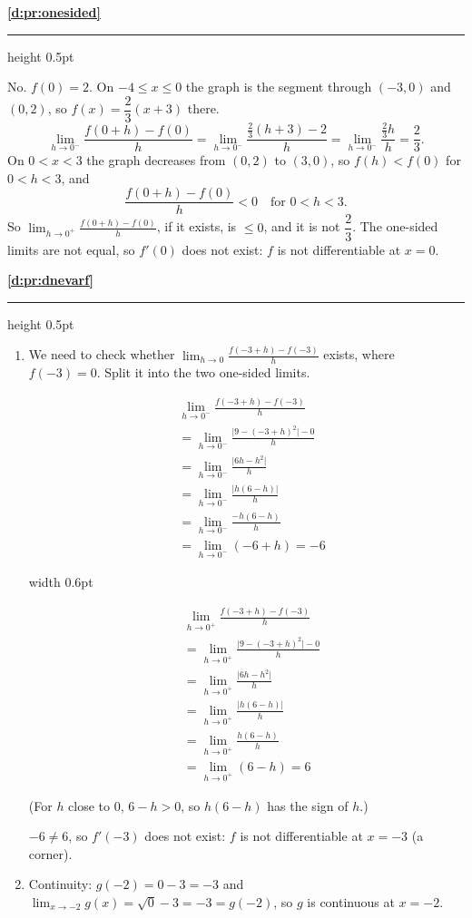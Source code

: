 \documentclass[11pt,a4paper]{article}
\newcommand{\solitem}[2]{%
 \par\addvspace{16pt}\Needspace{10\baselineskip}%
 {\large\bfseries \ref{#1}}\par\nobreak\vspace{2pt}%
 {\color{rulegray}\hrule height 0.5pt}\nobreak\vspace{7pt}%
 #2\par}
\newcommand{\twosides}[2]{\par\smallskip\noindent\begin{minipage}[t]{0.47\linewidth}#1\end{minipage}\hfill{\color{rulegray}\vrule width 0.6pt}\hfill\begin{minipage}[t]{0.47\linewidth}#2\end{minipage}\par\smallskip}
\begin{document}
\solitem{d:pr:onesided}{%
No. $f(0)=2$. On $-4\le x\le0$ the graph is the segment through $(-3,0)$ and $(0,2)$, so $f(x)=\dfrac23(x+3)$ there.
\[
\lim_{h\to0^-}\frac{f(0+h)-f(0)}{h}=\lim_{h\to0^-}\frac{\frac23(h+3)-2}{h}=\lim_{h\to0^-}\frac{\frac23h}{h}=\frac23.
\]
On $0<x<3$ the graph decreases from $(0,2)$ to $(3,0)$, so $f(h)<f(0)$ for $0<h<3$, and
\[
\frac{f(0+h)-f(0)}{h}<0 \quad\text{for } 0<h<3.
\]
So $\displaystyle\lim_{h\to0^+}\frac{f(0+h)-f(0)}{h}$, if it exists, is $\le0$, and it is not $\dfrac23$. The one-sided limits are not equal, so $f'(0)$ does not exist: $f$ is not differentiable at $x=0$.
}

\solitem{d:pr:dnevarf}{%
\begin{enumerate}[label=(\alph*)]
 \item We need to check whether $\displaystyle\lim_{h\to0}\frac{f(-3+h)-f(-3)}{h}$ exists, where $f(-3)=0$. Split it into the two one-sided limits.
 \twosides{%
 \begin{align*}
 &\lim_{h\to0^-}\frac{f(-3+h)-f(-3)}{h}\\
 &=\lim_{h\to0^-}\frac{\bigl|9-(-3+h)^2\bigr|-0}{h}\\
 &=\lim_{h\to0^-}\frac{\bigl|6h-h^2\bigr|}{h}\\
 &=\lim_{h\to0^-}\frac{\bigl|h(6-h)\bigr|}{h}\\
 &=\lim_{h\to0^-}\frac{-h(6-h)}{h}\\
 &=\lim_{h\to0^-}(-6+h)=-6
 \end{align*}}{%
 \begin{align*}
 &\lim_{h\to0^+}\frac{f(-3+h)-f(-3)}{h}\\
 &=\lim_{h\to0^+}\frac{\bigl|9-(-3+h)^2\bigr|-0}{h}\\
 &=\lim_{h\to0^+}\frac{\bigl|6h-h^2\bigr|}{h}\\
 &=\lim_{h\to0^+}\frac{\bigl|h(6-h)\bigr|}{h}\\
 &=\lim_{h\to0^+}\frac{h(6-h)}{h}\\
 &=\lim_{h\to0^+}(6-h)=6
 \end{align*}}
 (For $h$ close to $0$, $6-h>0$, so $h(6-h)$ has the sign of $h$.)

 $-6\ne6$, so $f'(-3)$ does not exist: $f$ is not differentiable at $x=-3$ (a corner).
 \item Continuity: $g(-2)=0-3=-3$ and $\displaystyle\lim_{x\to-2}g(x)=\sqrt0-3=-3=g(-2)$, so $g$ is continuous at $x=-2$.


\end{enumerate}}
\end{document}
